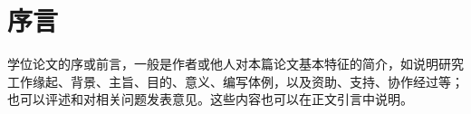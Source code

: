 \chapter*{序言}

学位论文的序或前言，一般是作者或他人对本篇论文基本特征的简介，如说明研究工作缘起、背景、主旨、目的、意义、编写体例，以及资助、支持、协作经过等；也可以评述和对相关问题发表意见。这些内容也可以在正文引言中说明。
